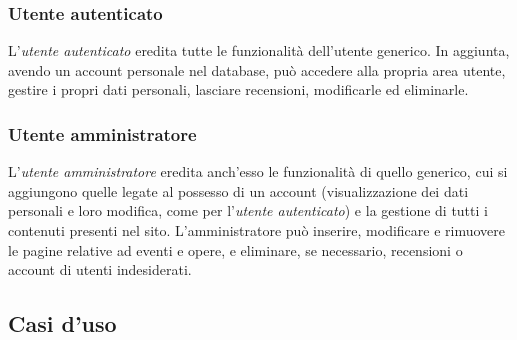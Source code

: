 \subsubsection{Utente autenticato}
\label{analisi-casi-uso-attori-principali-utente-autenticato}
L'\textit{utente autenticato} eredita tutte le funzionalità dell'utente generico. In aggiunta, avendo un account personale nel database, può accedere alla propria area utente, gestire i propri dati personali, lasciare recensioni, modificarle ed eliminarle.

\subsubsection{Utente amministratore}
\label{analisi-casi-uso-attori-principali-utente-amministratore}
L'\textit{utente amministratore} eredita anch'esso le funzionalità di quello generico, cui si aggiungono quelle legate al possesso di un account (visualizzazione dei dati personali e loro modifica, come per l'\textit{utente autenticato}) e  la gestione di tutti i contenuti presenti nel sito. L'amministratore può inserire, modificare e rimuovere le pagine relative ad eventi e opere, e eliminare, se necessario, recensioni o account di utenti indesiderati.


\subsection{Casi d'uso}
\label{analisi-casi-uso}

